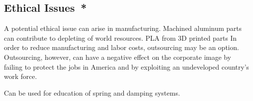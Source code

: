 \subsection*{Ethical Issues{{\color{red}\ *}}}
A potential ethical issue can arise in manufacturing. Machined aluminum parts can contribute to depleting of world resources.
PLA from 3D printed parts 
In order to reduce manufacturing and labor costs, outsourcing may be an option. Outsourcing, however, can have a negative effect on the corporate image by failing to protect the jobs in America and by exploiting an undeveloped country's work force.

Can be used for education of spring and damping systems.